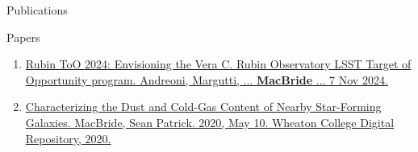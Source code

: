 \documentclass{resume} %
\begin{document}
\newpage
\begin{rSection}{Publications}
    \begin{rSubsection}{Papers}{}{}{} %
        \begin{enumerate}
            \item \href{https://arxiv.org/abs/2411.04793}{
Rubin ToO 2024: Envisioning the Vera C. Rubin Observatory LSST Target of Opportunity program. Andreoni, Margutti, ... \textbf{MacBride} ... 7 Nov 2024.} 
            \item \href{https://digitalrepository.wheatoncollege.edu/handle/11040/31192}{Characterizing the Dust and Cold-Gas Content of Nearby Star-Forming Galaxies. MacBride, Sean Patrick. 2020, May 10.  Wheaton College Digital Repository, 2020.}
        \end{enumerate}
            
    \end{rSubsection}    
\end{rSection}
\end{document}
